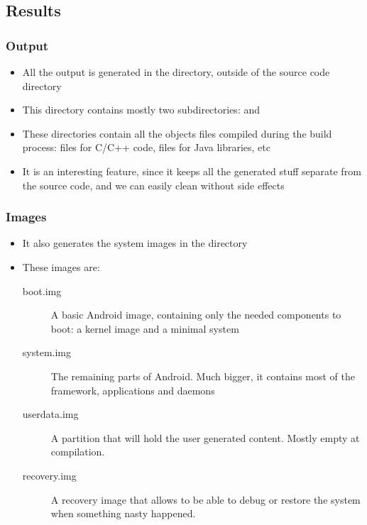 \subsection{Results}

\begin{frame}
  \frametitle{Output}
  \begin{itemize}
  \item All the output is generated in the
     directory, outside of the source code directory
  \item This directory contains mostly two subdirectories:
     and 
  \item These directories contain all the objects files compiled
    during the build process:  files for C/C++ code,
     files for Java libraries, etc
  \item It is an interesting feature, since it keeps all the generated
    stuff separate from the source code, and we can easily clean without
    side effects
  \end{itemize}
\end{frame}

\begin{frame}
  \frametitle{Images}
  \begin{itemize}
  \item It also generates the system images in the
     directory
  \item These images are:
    \begin{description}
    \item[boot.img] A basic Android image, containing only the needed
      components to boot: a kernel image and a minimal system
    \item[system.img] The remaining parts of Android. Much bigger, it
      contains most of the framework, applications and daemons
    \item[userdata.img] A partition that will hold the user generated
      content. Mostly empty at compilation.
    \item[recovery.img] A recovery image that allows to be able to
      debug or restore the system when something nasty happened.
    \end{description}
  \end{itemize}
\end{frame}


